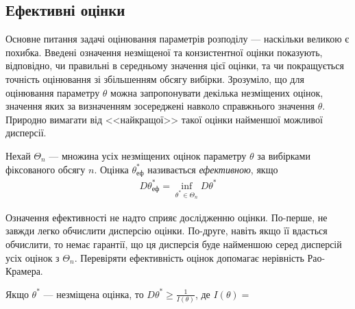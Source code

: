 \subsection{Ефективні оцінки}
Основне питання задачі оцінювання параметрів розподілу --- наскільки великою є похибка. 
Введені означення незміщеної та конзистентної оцінки показують, відповідно, чи правильні в середньому значення цієї оцінки,
та чи покращується точність оцінювання зі збільшенням обсягу вибірки.
Зрозуміло, що для оцінювання параметру $\theta$ можна запропонувати декілька незміщених оцінок, значення яких за визначенням
зосереджені навколо справжнього значення $\theta$. Природно вимагати від <<найкращої>> такої оцінки найменшої можливої дисперсії.
\begin{definition}
    Нехай $\Theta_n$ --- множина усіх незміщених оцінок параметру $\theta$ за вибірками фіксованого обсягу $n$. 
    Оцінка $\theta^*_{\text{еф}}$ називається
    \emph{ефективною}, якщо 
    \begin{gather}\label{estim_eff}
        D\theta^*_{\text{еф}} = \underset{\theta^* \in \Theta_n}{\inf} D\theta^*
    \end{gather}
\end{definition}
Означення ефективності не надто сприяє дослідженню оцінки. По-перше, не завжди
легко обчислити дисперсію оцінки. По-друге, навіть якщо її вдасться обчислити, то немає гарантії, що ця дисперсія буде найменшою серед дисперсій усіх оцінок
з $\Theta_n$. Перевіряти ефективність оцінок допомагає нерівність Рао-Крамера.

\begin{theorem*}
    Якщо $\theta^*$ --- незміщена оцінка, то $D\theta^* \geq \frac{1}{I(\theta)}$, 
    де $I(\theta) = $
\end{theorem*}